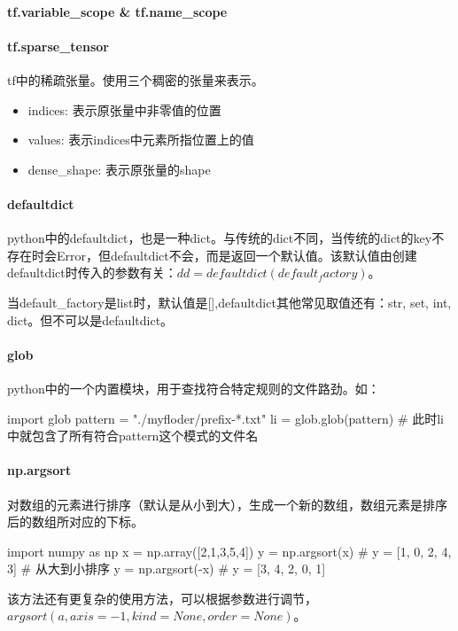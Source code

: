 \paragraph{tf.variable\_scope \& tf.name\_scope}

\paragraph{tf.sparse\_tensor}	tf中的稀疏张量。使用三个稠密的张量来表示。
\begin{itemize}
	\item indices: 表示原张量中非零值的位置
	\item values: 表示indices中元素所指位置上的值
	\item dense\_shape: 表示原张量的shape
\end{itemize}

\paragraph{defaultdict}python中的defaultdict，也是一种dict。与传统的dict不同，当传统的dict的key不存在时会Error，但defaultdict不会，而是返回一个默认值。该默认值由创建defaultdict时传入的参数有关：$dd = defaultdict(default_factory)$。

当default\_factory是list时，默认值是[],defaultdict其他常见取值还有：str, set, int, dict。但不可以是defaultdict。

\paragraph{glob}python中的一个内置模块，用于查找符合特定规则的文件路劲。如：
\begin{python}
	import glob
	pattern = "./myfloder/prefix-*.txt"
	li = glob.glob(pattern) # 此时li中就包含了所有符合pattern这个模式的文件名
\end{python}


\paragraph{np.argsort}对数组的元素进行排序（默认是从小到大），生成一个新的数组，数组元素是排序后的数组所对应的下标。
\begin{python}
	import numpy as np
	x = np.array([2,1,3,5,4])
	y = np.argsort(x) # y = [1, 0, 2, 4, 3]
	# 从大到小排序
	y = np.argsort(-x) # y = [3, 4, 2, 0, 1]
\end{python}
该方法还有更复杂的使用方法，可以根据参数进行调节，$argsort(a, axis=-1, kind=None, order=None)$。


